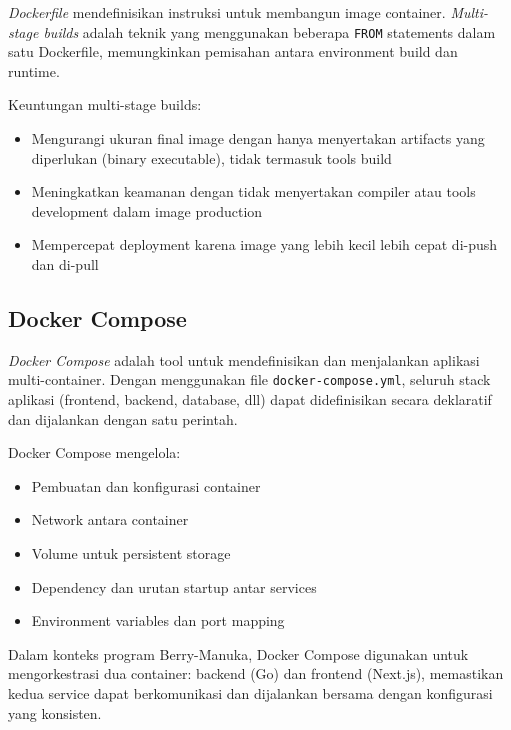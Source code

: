 \textit{Dockerfile} mendefinisikan instruksi untuk membangun image container.
\textit{Multi-stage builds} adalah teknik yang menggunakan beberapa \texttt{FROM}
statements dalam satu Dockerfile, memungkinkan pemisahan antara environment
build dan runtime.

Keuntungan multi-stage builds:
\begin{itemize}
    \item Mengurangi ukuran final image dengan hanya menyertakan artifacts yang
    diperlukan (binary executable), tidak termasuk tools build
    \item Meningkatkan keamanan dengan tidak menyertakan compiler atau tools
    development dalam image production
    \item Mempercepat deployment karena image yang lebih kecil lebih cepat di-push
    dan di-pull
\end{itemize}

\subsection{Docker Compose}

\textit{Docker Compose} adalah tool untuk mendefinisikan dan menjalankan
aplikasi multi-container. Dengan menggunakan file \texttt{docker-compose.yml},
seluruh stack aplikasi (frontend, backend, database, dll) dapat didefinisikan
secara deklaratif dan dijalankan dengan satu perintah.

Docker Compose mengelola:
\begin{itemize}
    \item Pembuatan dan konfigurasi container
    \item Network antara container
    \item Volume untuk persistent storage
    \item Dependency dan urutan startup antar services
    \item Environment variables dan port mapping
\end{itemize}

Dalam konteks program Berry-Manuka, Docker Compose digunakan untuk mengorkestrasi
dua container: backend (Go) dan frontend (Next.js), memastikan kedua service
dapat berkomunikasi dan dijalankan bersama dengan konfigurasi yang konsisten.
